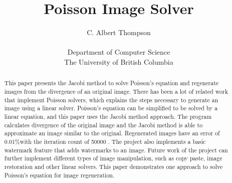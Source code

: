 \documentclass[10pt,twopage]{acmsiggraph}
\begin{document}
\newcommand\result{0.01\%}
\newcommand\iteration{50000 }

%
%

\title{Poisson Image Solver}

\newcommand\name{C. Albert Thompson}

\author{\name\\
\\
Department of Computer Science\\
The University of British Columbia}

\maketitle

%
%

\begin{abstract}
This paper presents the Jacobi method to solve Poisson's equation and regenerate images from the divergence of an original image. There has been a lot of related work that implement Poisson solvers, which explains the steps necessary to generate an image using a linear solver. Poisson's equation can be simplified to be solved by a linear equation, and this paper uses the Jacobi method approach. The program calculates divergence of the original image and the Jacobi method is able to approximate an image similar to the original.  Regenerated images have an error of \result with the iteration count of \iteration. The project also implements a basic watermark feature that adds watermarks to an image. Future work of the project can further implement different types of image manipulation, such as copy paste, image restoration and other linear solvers. This paper demonstrates one approach to solve Poisson's equation for image regeneration.
\end{abstract}

%
%
\end{document}
